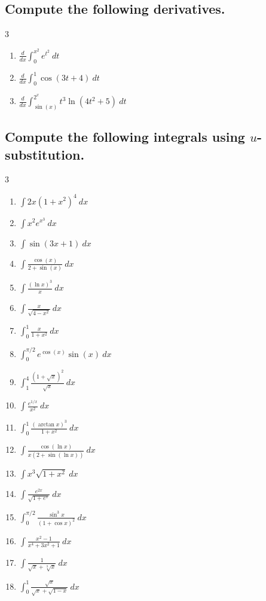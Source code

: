 \documentclass{article}
\begin{document}
\subsection{Compute the following derivatives.}

\begin{multicols}{3}
\begin{enumerate}
\item $\displaystyle \frac{d}{dx}\int_0^{x^2}e^{t^2}\ dt$
\item $\displaystyle \frac{d}{dx}\int_0^{1}\cos(3t+4)\ dt$
\item $\displaystyle \frac{d}{dx}\int_{\sin(x)}^{2^x}t^3\ln(4t^2+5)\ dt$
\end{enumerate}
\end{multicols}


\subsection{Compute the following integrals using \texorpdfstring{$u$}{u}-substitution.}

\begin{multicols}{3}
\begin{enumerate}
\item $\displaystyle \int 2x(1+x^2)^4\ dx$
\item $\displaystyle \int x^2 e^{x^3}\ dx$
\item $\displaystyle \int \sin(3x+1)\ dx$
\item $\displaystyle \int \frac{\cos(x)}{2+\sin(x)}\ dx$
\item $\displaystyle \int \frac{(\ln x)^3}{x}\ dx$
\item $\displaystyle \int \frac{x}{\sqrt{4-x^2}}\ dx$
\item $\displaystyle \int_0^1 \frac{x}{1+x^2}\ dx$
\item $\displaystyle \int_0^{\pi/2} e^{\cos(x)}\sin(x)\ dx$
\item $\displaystyle \int_1^4 \frac{(1+\sqrt{x})^2}{\sqrt{x}}\ dx$
\item $\displaystyle \int \frac{e^{1/x}}{x^2}\ dx$
\item $\displaystyle \int_0^1 \frac{(\arctan x)^3}{1+x^2}\ dx$
\item $\displaystyle \int \frac{\cos(\ln x)}{x(2+\sin(\ln x))}\ dx$
\item $\displaystyle \int x^3\sqrt{1+x^2}\ dx$
\item $\displaystyle \int \frac{e^{2x}}{\sqrt{1+e^x}}\ dx$
\item $\displaystyle \int_0^{\pi/2} \frac{\sin^3 x}{(1+\cos x)^2}\ dx$
\item $\displaystyle \int \frac{x^2-1}{x^4+3x^2+1}\ dx$
\item $\displaystyle \int \frac{1}{\sqrt{x}+\sqrt[3]{x}}\ dx$
\item $\displaystyle \int_0^1 \frac{\sqrt{x}}{\sqrt{x}+\sqrt{1-x}}\ dx$
\end{enumerate}
\end{multicols}
\end{document}
